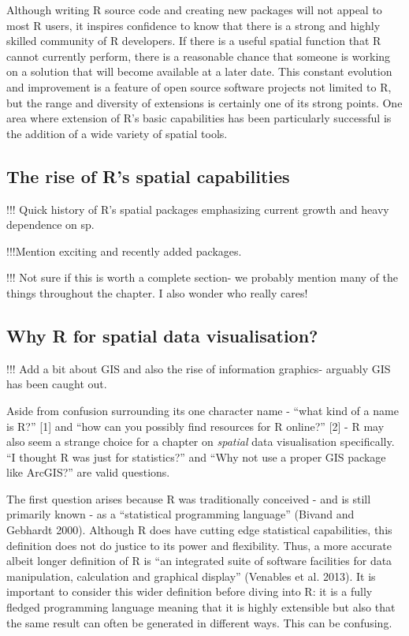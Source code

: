 \documentclass[]{article}
\begin{document}
Although writing R source code and creating new packages will not appeal
to most R users, it inspires confidence to know that there is a strong
and highly skilled community of R developers. If there is a useful
spatial function that R cannot currently perform, there is a reasonable
chance that someone is working on a solution that will become available
at a later date. This constant evolution and improvement is a feature of
open source software projects not limited to R, but the range and
diversity of extensions is certainly one of its strong points. One area
where extension of R's basic capabilities has been particularly
successful is the addition of a wide variety of spatial tools.

\subsection{The rise of R's spatial capabilities}

!!! Quick history of R's spatial packages emphasizing current growth and
heavy dependence on sp.

!!!Mention exciting and recently added packages.

!!! Not sure if this is worth a complete section- we probably mention
many of the things throughout the chapter. I also wonder who really
cares!

\subsection{Why R for spatial data visualisation?}

!!! Add a bit about GIS and also the rise of information graphics-
arguably GIS has been caught out.

Aside from confusion surrounding its one character name - ``what kind of
a name is R?'' {[}1{]} and ``how can you possibly find resources for R
online?'' {[}2{]} - R may also seem a strange choice for a chapter on
\emph{spatial} data visualisation specifically. ``I thought R was just
for statistics?'' and ``Why not use a proper GIS package like ArcGIS?''
are valid questions.

The first question arises because R was traditionally conceived - and is
still primarily known - as a ``statistical programming language''
(Bivand and Gebhardt 2000). Although R does have cutting edge
statistical capabilities, this definition does not do justice to its
power and flexibility. Thus, a more accurate albeit longer definition of
R is ``an integrated suite of software facilities for data manipulation,
calculation and graphical display'' (Venables et al. 2013). It is
important to consider this wider definition before diving into R: it is
a fully fledged programming language meaning that it is highly
extensible but also that the same result can often be generated in
different ways. This can be confusing.
\end{document}
